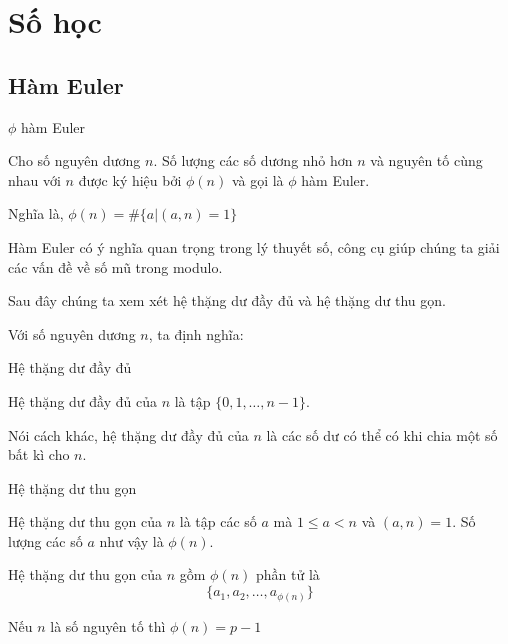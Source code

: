 \section{Số học}

\subsection{Hàm Euler}

\begin{defblock}{$\phi$ hàm Euler}
    
    Cho số nguyên dương $n$. Số lượng các số dương nhỏ hơn $n$ và nguyên tố cùng nhau với $n$ được ký hiệu bởi $\phi(n)$ và gọi là $\phi$ hàm Euler.

    Nghĩa là, $\phi(n) = \# \{ a | (a, n) = 1\}$
\end{defblock}

Hàm Euler có ý nghĩa quan trọng trong lý thuyết số, công cụ giúp chúng ta giải các vấn đề về số mũ trong modulo.

Sau đây chúng ta xem xét hệ thặng dư đầy đủ và hệ thặng dư thu gọn.

Với số nguyên dương $n$, ta định nghĩa:

\begin{defblock}{Hệ thặng dư đầy đủ}

    \begin{definition}
        Hệ thặng dư đầy đủ của $n$ là tập $\{0, 1, \ldots, n-1\}$.
    \end{definition}
\end{defblock}

Nói cách khác, hệ thặng dư đầy đủ của $n$ là các số dư có thể có khi chia một số bất kì cho $n$.

\begin{defblock}{Hệ thặng dư thu gọn}

    \begin{definition}
        Hệ thặng dư thu gọn của $n$ là tập các số $a$ mà $1 \leq a < n$ và $(a, n) = 1$. Số lượng các số $a$ như vậy là $\phi (n)$.  
    \end{definition}

\end{defblock}

\begin{remark}
    Hệ thặng dư thu gọn của $n$ gồm $\phi(n)$ phần tử là \[\{a_1, a_2, \ldots, a_{\phi(n)}\}\]
\end{remark}

\begin{remark}
    Nếu $n$ là số nguyên tố thì $\phi(n) = p-1$
\end{remark}
